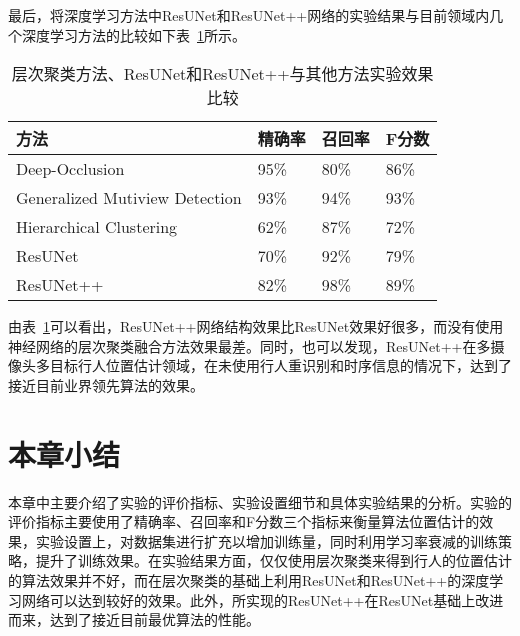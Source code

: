 最后，将深度学习方法中ResUNet和ResUNet++网络的实验结果与目前领域内几个深度学习方法的比较如下表~\ref{experiments}所示。
\begin{table}
    \centering
    \caption{层次聚类方法、ResUNet和ResUNet++与其他方法实验效果比较}
    \begin{tabular}{llll}
        \toprule
        方法 & 精确率  & 召回率 & F分数                       \\
        \midrule
        Deep-Occlusion\cite{baque2017deep} & 95\% & 80\% & 86\%                  \\
        Generalized Mutiview Detection\cite{2021Generalizable} & 93\% & 94\% & 93\%  \\
        Hierarchical Clustering & 62\% & 87\% & 72\%         \\
        ResUNet & 70\% & 92\% & 79\%                         \\
        ResUNet++ & 82\% & 98\% & 89\%                      \\
        \bottomrule
    \end{tabular}
    \label{experiments}
\end{table}

由表~\ref{experiments}可以看出，ResUNet++网络结构效果比ResUNet效果好很多，而没有使用神经网络的层次聚类融合方法效果最差。同时，也可以发现，ResUNet++在多摄像头多目标行人位置估计领域，在未使用行人重识别和时序信息的情况下，达到了接近目前业界领先算法的效果。

\section{本章小结}

本章中主要介绍了实验的评价指标、实验设置细节和具体实验结果的分析。实验的评价指标主要使用了精确率、召回率和F分数三个指标来衡量算法位置估计的效果，实验设置上，对数据集进行扩充以增加训练量，同时利用学习率衰减的训练策略，提升了训练效果。在实验结果方面，仅仅使用层次聚类来得到行人的位置估计的算法效果并不好，而在层次聚类的基础上利用ResUNet和ResUNet++的深度学习网络可以达到较好的效果。此外，所实现的ResUNet++在ResUNet基础上改进而来，达到了接近目前最优算法的性能。
